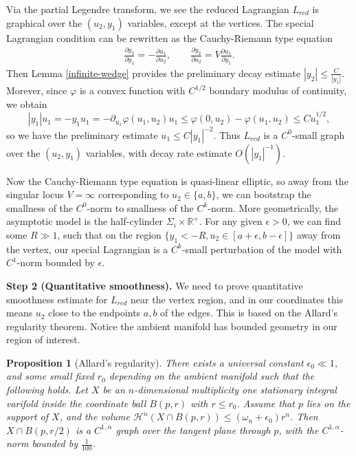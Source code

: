 \documentclass[11pt]{article}
\newtheorem{proposition}{Proposition}
\begin{document}
Via the partial Legendre transform, we see the reduced Lagrangian $L_{red}$ is graphical over the $( u_2, y_1)$ variables, except at the vertices. The special Lagrangian condition can be rewritten as the Cauchy-Riemann type equation
\begin{align*} \label{quasi-elliptic}
    \frac{\partial y_2}{\partial y_1} = -\frac{\partial u_1}{\partial u_2}, \quad \quad \frac{\partial y_2}{\partial u_2} = V \frac{\partial u_1}{\partial y_1}.
\end{align*}
Then Lemma \ref{infinite-wedge} provides the preliminary decay estimate $|y_2|\leq \frac{C}{|y_1|}$. Morever, since $\varphi$ is a convex function with $C^{1/2}$ boundary modulus of continuity, we obtain 
\[
|y_1|u_1= -y_1 u_1= -\partial_{u_1} \varphi(u_1,u_2) u_1 \leq \varphi(0,u_2) -\varphi(u_1,u_2) \leq C u_1^{1/2},
\]
so we have the preliminary estimate $u_1\leq C|y_1|^{-2}$. Thus $L_{red}$ is a $C^0$-small graph over the $(u_2, y_1)$ variables, with decay rate estimate $O(|y_1|^{-1})$.



Now the Cauchy-Riemann type equation is quasi-linear elliptic, so away from the singular locus  $V = \infty$ corresponding to  $u_2\in \{ a,b \}$, we can bootstrap the smallness of the $C^0$-norm to smallness of the $C^k$-norm. More geometrically, the asymptotic model is the half-cylinder $\Sigma_i\times \mathbb{R}^+$. For any given $\epsilon>0$, we can find some $R\gg 1$, such that on the region $\{ y_1<-R, u_2\in [a+\epsilon, b-\epsilon]  \}$ away from the vertex, our special Lagrangian is a $C^k$-small perturbation of the model with $C^1$-norm bounded by $\epsilon$.






\textbf{Step 2 (Quantitative smoothness).} 
We need to prove quantitative smoothness estimate for $L_{red}$ near the vertex region, and in our coordinates this means $u_2$ close to the endpoints $a,b$ of the edges. 
This is based on the Allard's regularity theorem. Notice the ambient manifold has bounded geometry in our region of interest. 


\begin{proposition}[Allard's regularity] There exists a universal constant $\epsilon_0 \ll 1$, and some small fixed $r_0$ depending on the ambient manifold such that the following holds. Let $X$ be an $n$-dimensional multiplicity one stationary integral varifold inside the coordinate ball $B(p, r)$ with $r\leq r_0$. Assume that $p$ lies on the support of $X$, and the volume $\mathcal{H}^n(X \cap B(p,r)) \leq (\omega_n+\epsilon_0)r^n$. Then $X \cap B(p,r/2)$ is a $C^{1, \alpha}$ graph over the tangent plane through $p$, with the $C^{1, \alpha}$-norm bounded by $\frac{1}{100}$.
\end{proposition}
\end{document}

